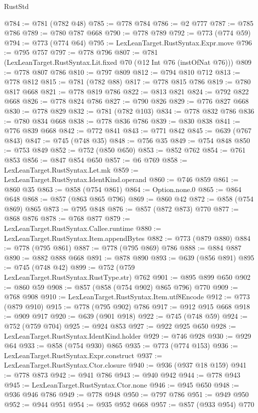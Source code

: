 \begin{lexlean}{RustStd}
\begin{coremodule}
@784 := @781 (@782 @48)
@785 := @778 @784
@786 := @2 @777
@787 := @785 @786
@789 := @780 @787 @668
@790 := @778 @789
@792 := @773 (@774 @59)
@794 := @773 (@774 @64)
@795 := LexLeanTarget.RustSyntax.Expr.move
@796 := @795 @757
@797 := @778 @796
@807 := @781 (LexLeanTarget.RustSyntax.Lit.fixed @70 (@12 Int @76 (instOfNat @76)))
@809 := @778 @807 @786
@810 := @797 @809
@812 := @794 @810 @712
@813 := @778 @812
@815 := @781 (@782 @88)
@817 := @778 @815 @786
@819 := @780 @817 @668
@821 := @778 @819 @786
@822 := @813 @821
@824 := @792 @822 @668
@826 := @778 @824 @786
@827 := @790 @826
@829 := @776 @827 @668
@830 := @778 @829
@832 := @781 (@782 @103)
@834 := @778 @832 @786
@836 := @780 @834 @668
@838 := @778 @836 @786
@839 := @830 @838
@841 := @776 @839 @668
@842 := @772 @841
@843 := @771 @842
@845 := @639 (@767 @843)
@847 := @745 (@748 @35)
@848 := @756 @35
@849 := @754 @848
@850 := @753 @849
@852 := @752 (@850 @650)
@853 := @852 @762
@854 := @761 @853
@856 := @847 @854 @650
@857 := @6 @769
@858 := LexLeanTarget.RustSyntax.Let.mk
@859 := LexLeanTarget.RustSyntax.IdentKind.operand
@860 := @746 @859
@861 := @860 @35
@863 := @858 (@754 @861)
@864 := Option.none.{0}
@865 := @864 @648
@868 := @857 (@863 @865 @796)
@869 := @860 @42
@872 := @858 (@754 @869) @865
@873 := @795 @848
@876 := @857 (@872 @873) @770
@877 := @868 @876
@878 := @768 @877
@879 := LexLeanTarget.RustSyntax.Callee.runtime
@880 := LexLeanTarget.RustSyntax.Item.appendBytes
@882 := @773 (@879 @880)
@884 := @778 (@795 @861)
@887 := @778 (@795 @869) @786
@888 := @884 @887
@890 := @882 @888 @668
@891 := @878 @890
@893 := @639 (@856 @891)
@895 := @745 (@748 @42)
@899 := @752 (@759 LexLeanTarget.RustSyntax.RustType.str) @762
@901 := @895 @899 @650
@902 := @860 @59
@908 := @857 (@858 (@754 @902) @865 @796) @770
@909 := @768 @908
@910 := LexLeanTarget.RustSyntax.Item.utf8Encode
@912 := @773 (@879 @910)
@915 := @778 (@795 @902) @786
@917 := @912 @915 @668
@918 := @909 @917
@920 := @639 (@901 @918)
@922 := @745 (@748 @59)
@924 := @752 (@759 @704)
@925 := @924 @853
@927 := @922 @925 @650
@928 := LexLeanTarget.RustSyntax.IdentKind.holder
@929 := @746 @928
@930 := @929 @64
@933 := @858 (@754 @930) @865
@935 := @773 (@774 @153)
@936 := LexLeanTarget.RustSyntax.Expr.construct
@937 := LexLeanTarget.RustSyntax.Ctor.closure
@940 := @936 (@937 @18 @159)
@941 := @778 @873
@942 := @941 @786
@943 := @940 @942
@944 := @778 @943
@945 := LexLeanTarget.RustSyntax.Ctor.none
@946 := @945 @650
@948 := @936 @946 @786
@949 := @778 @948
@950 := @797 @786
@951 := @949 @950
@952 := @944 @951
@954 := @935 @952 @668
@957 := @857 (@933 @954) @770

\end{coremodule}
\end{lexlean}

